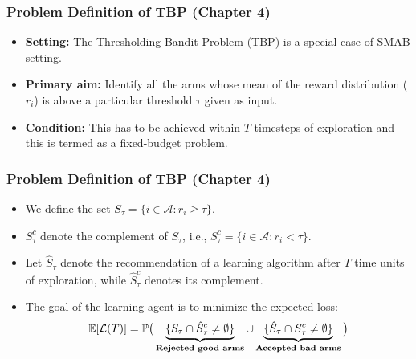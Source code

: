 \begin{frame}
\frametitle{Problem Definition of TBP ({Chapter 4})}
\begin{itemize}
\item<0-> \textbf{Setting:} The Thresholding Bandit Problem (TBP) is a special case of SMAB setting.
\item<1-> \textbf{Primary aim:} Identify all the arms whose mean of the reward distribution ($r_i$) is above a particular threshold $\tau$ given as input.
\item<2-> \textbf{Condition:} This has to be achieved within $T$ timesteps of exploration and this is termed as a fixed-budget problem.
\end{itemize}
\end{frame}

\begin{frame}
\frametitle{Problem Definition of TBP ({Chapter 4})}
\begin{itemize}
\item<1-> We define the set $S_{\tau}=\lbrace i\in \mathcal{A}: r_{i}\geq \tau \rbrace$. 
\item<2-> $S_\tau^c$ denote the complement of $S_\tau$, i.e.,  $S_{\tau}^{c}=\lbrace i\in \mathcal{A}: r_{i} < \tau \rbrace$. 
\item<3-> Let $\hat{S}_{\tau}$ denote the recommendation of a learning algorithm after $T$ time units of exploration, while $\hat{S}_{\tau}^c$ denotes its complement.


\item<4-> The goal of the learning agent is to minimize the expected loss:
\begin{align*}
\mathbb{E}[\mathcal{L}(T)] &= \mathbb{P}\big(\underbrace{\lbrace S_{\tau}\cap \hat{S}_{\tau}^{c} \neq \emptyset \rbrace}_{\textbf{Rejected good arms}}  \cup   \underbrace{\lbrace \hat{S}_{\tau}\cap S_{\tau}^{c} \neq \emptyset\rbrace}_{\textbf{Accepted bad arms}}\big) \\
\end{align*}
\end{itemize}
\end{frame}

